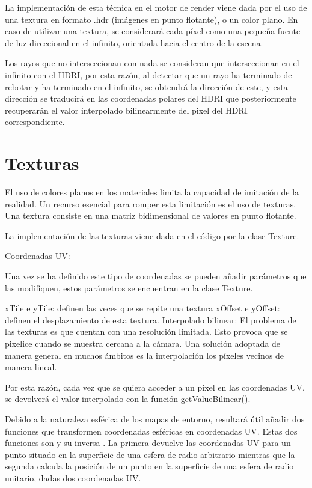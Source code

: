 \begin{itemize}
	La implementación de esta técnica en el motor de render viene dada por el uso de una textura en formato .hdr (imágenes en punto flotante), o un color plano. En caso de utilizar una textura, se considerará cada píxel como una pequeña fuente de luz direccional en el infinito, orientada hacia el centro de la escena. 

	Los rayos que no interseccionan con nada se consideran que interseccionan en el infinito con el HDRI, por esta razón, al detectar que un rayo ha terminado de rebotar y ha terminado en el infinito, se obtendrá la dirección de este, y esta dirección se traducirá en las coordenadas polares del HDRI que posteriormente recuperarán el valor interpolado bilinearmente del pixel del HDRI correspondiente.

	\end{itemize}

	\section{Texturas}
	
	El uso de colores planos en los materiales limita la capacidad de imitación de la realidad. Un recurso esencial para romper esta limitación es el uso de texturas. Una textura consiste en una matriz bidimensional de valores en punto flotante.

	La implementación de las texturas viene dada en el código por la clase Texture.
	
	
	Coordenadas UV:

	Una vez se ha definido este tipo de coordenadas se pueden añadir parámetros que las modifiquen, estos parámetros se encuentran en la clase Texture.

	xTile e yTile: definen las veces que se repite una textura
	xOffset e yOffset: definen el desplazamiento de esta textura.
	Interpolado bilinear:
	El problema de las texturas es que cuentan con una resolución limitada. Esto provoca que se pixelice cuando se muestra cercana a la cámara. Una solución adoptada de manera general en muchos ámbitos es la interpolación los píxeles vecinos de manera lineal. 




	Por esta razón, cada vez que se quiera acceder a un píxel en las coordenadas UV, se devolverá el valor interpolado con la función getValueBilinear().

	Debido a la naturaleza esférica de los mapas de entorno, resultará útil añadir dos funciones que transformen coordenadas esféricas en coordenadas UV. Estas dos funciones son  y su inversa . La primera devuelve las coordenadas UV para un punto situado en la superficie de una esfera de radio arbitrario mientras que la segunda calcula la posición de un punto en la superficie de una esfera de radio unitario, dadas dos coordenadas UV.

